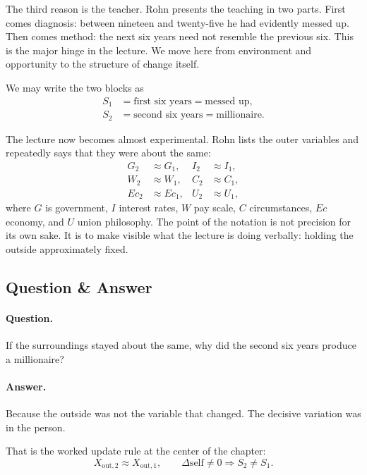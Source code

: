The third reason is the teacher. Rohn presents the teaching in two parts. First comes diagnosis: between nineteen and twenty-five he had evidently messed up. Then comes method: the next six years need not resemble the previous six. This is the major hinge in the lecture. We move here from environment and opportunity to the structure of change itself.

We may write the two blocks as
\begin{align}
S_1 &= \text{first six years}=\text{messed up},\\
S_2 &= \text{second six years}=\text{millionaire}.
\end{align}

The lecture now becomes almost experimental. Rohn lists the outer variables and repeatedly says that they were about the same:
\begin{align}
G_2 &\approx G_1, & I_2 &\approx I_1,\\
W_2 &\approx W_1, & C_2 &\approx C_1,\\
Ec_2 &\approx Ec_1, & U_2 &\approx U_1,
\end{align}
where \(G\) is government, \(I\) interest rates, \(W\) pay scale, \(C\) circumstances, \(Ec\) economy, and \(U\) union philosophy. The point of the notation is not precision for its own sake. It is to make visible what the lecture is doing verbally: holding the outside approximately fixed.

\subsection{Question \& Answer}

\paragraph{Question.} If the surroundings stayed about the same, why did the second six years produce a millionaire?

\paragraph{Answer.} Because the outside was not the variable that changed. The decisive variation was in the person.

That is the worked update rule at the center of the chapter:
\begin{equation}
X_{\text{out},2} \approx X_{\text{out},1},
\qquad
\Delta \text{self} \neq 0
\Longrightarrow
S_2 \neq S_1.
\end{equation}

